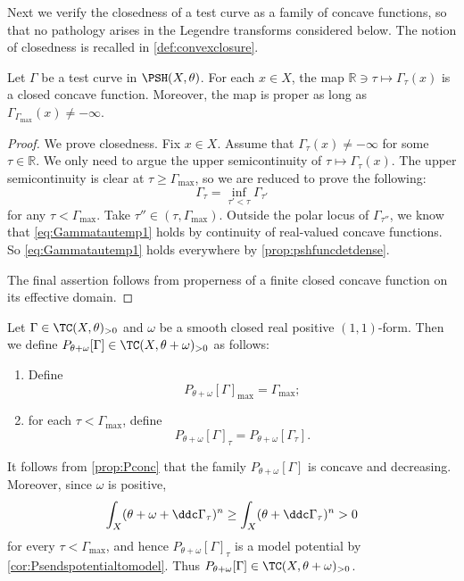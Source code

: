 Next we verify the closedness of a test curve as a family of concave functions, so that no pathology arises in the Legendre transforms considered below. The notion of closedness is recalled in \cref{def:convexclosure}.
\begin{proposition}\label{prop:Gammaclosed}
    Let $\Gamma$ be a test curve in $\PSH(X,\theta)$. For each $x\in X$, the map $\mathbb{R} \ni\tau\mapsto \Gamma_{\tau}(x)$ is a closed concave function. Moreover, the map is proper as long as $\Gamma_{\Gamma_{\max}}(x)\neq -\infty$.
\end{proposition}

\begin{proof}
    We prove closedness.
    Fix $x\in X$. Assume that $\Gamma_{\tau}(x)\neq -\infty$ for some $\tau\in \mathbb{R}$. We only need to argue the upper semicontinuity of $\tau\mapsto \Gamma_{\tau}(x)$. The upper semicontinuity is clear at $\tau\geq \Gamma_{\max}$, so we are reduced to prove the following:
    \begin{equation}\label{eq:Gammatautemp1}
        \Gamma_{\tau}=\inf_{\tau'<\tau}\Gamma_{\tau'}
    \end{equation}
    for any $\tau<\Gamma_{\max}$. Take $\tau''\in (\tau,\Gamma_{\max})$. Outside the polar locus of $\Gamma_{\tau''}$, we know that \eqref{eq:Gammatautemp1} holds by continuity of real-valued concave functions. So \eqref{eq:Gammatautemp1} holds everywhere by \cref{prop:pshfuncdetdense}.

    The final assertion follows from properness of a finite closed concave function on its effective domain.
\end{proof}


\begin{definition}\label{def:Ptestcurve}
    Let $\Gamma\in \TC(X,\theta)_{>0}$ and $\omega$ be a smooth closed real positive $(1,1)$-form. Then we define
    $P_{\theta+\omega}[\Gamma]\in \TC(X,\theta+\omega)_{>0}$ as follows:
    \begin{enumerate}
        \item\label{itm:def:Ptestcurve:1} Define
        \[
        P_{\theta+\omega}[\Gamma]_{\max}=\Gamma_{\max};
        \]
        \item\label{itm:def:Ptestcurve:2} for each $\tau<\Gamma_{\max}$, define
        \[
        P_{\theta+\omega}[\Gamma]_{\tau}=P_{\theta+\omega}[\Gamma_{\tau}].
        \]
    \end{enumerate}
\end{definition}
It follows from \cref{prop:Pconc} that the family $P_{\theta+\omega}[\Gamma]$ is concave and decreasing. Moreover, since $\omega$ is positive,
\[
\int_X(\theta+\omega+\ddc\Gamma_\tau)^n \geq \int_X(\theta+\ddc\Gamma_\tau)^n>0
\]
for every $\tau<\Gamma_{\max}$, and hence $P_{\theta+\omega}[\Gamma]_\tau$ is a model potential by \cref{cor:Psendspotentialtomodel}. Thus $P_{\theta+\omega}[\Gamma]\in\TC(X,\theta+\omega)_{>0}$.

